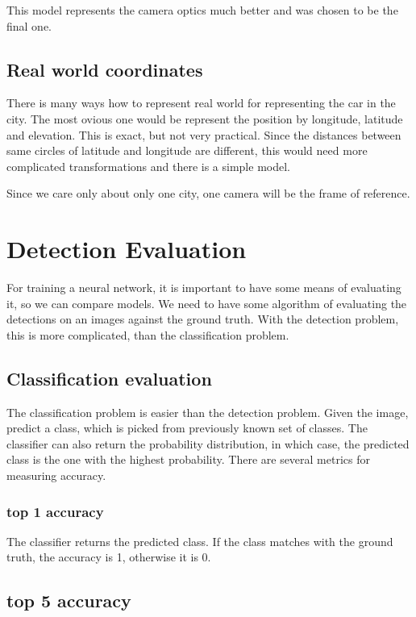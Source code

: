 \documentclass[a4paper,12pt,titlepage, twoside]{article}
\numberwithin{figure}{section}
\begin{document}
This model represents the camera optics much better and was chosen to be the final one.

\subsection{Real world coordinates}

There is many ways how to represent real world for representing the car in the city. The most ovious one would be represent the position by longitude, latitude and elevation. This is exact, but not very practical. Since the distances between same circles of latitude and longitude are different, this would need more complicated transformations and there is a simple model. 

Since we care only about only one city, one camera will be the frame of reference.








\section{Detection Evaluation}
For training a neural network, it is important to have some means of evaluating it, so we can compare models. We need to have some algorithm of evaluating the detections on an images against the ground truth. With the detection problem, this is more complicated, than the classification problem.

\subsection{Classification evaluation}

The classification problem is easier than the detection problem. Given the image, predict a class, which is picked from previously known set of classes. The classifier can also return the probability distribution, in which case, the predicted class is the one with the highest probability. There are several metrics for measuring accuracy.

\subsubsection{top 1 accuracy}

The classifier returns the predicted class. If the class matches with the ground truth, the accuracy is 1, otherwise it is 0.

\subsection{top 5 accuracy}
\end{document}

